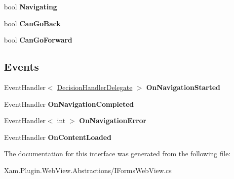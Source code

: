 \begin{DoxyCompactItemize}
bool {\bfseries Navigating}
\item 
\mbox{\label{interface_xam_1_1_plugin_1_1_web_view_1_1_abstractions_1_1_i_forms_web_view_a6189ad707789cb0eb2ff838b939c2c0d}} 
bool {\bfseries Can\+Go\+Back}
\item 
\mbox{\label{interface_xam_1_1_plugin_1_1_web_view_1_1_abstractions_1_1_i_forms_web_view_afb0f73e90962e66edd999a222a0ee62c}} 
bool {\bfseries Can\+Go\+Forward}
\end{DoxyCompactItemize}
\subsection*{Events}
\begin{DoxyCompactItemize}
\item 
\mbox{\label{interface_xam_1_1_plugin_1_1_web_view_1_1_abstractions_1_1_i_forms_web_view_aae722771350cc9dab5fd12e017a3635e}} 
Event\+Handler$<$ \hyperlink{class_xam_1_1_plugin_1_1_web_view_1_1_abstractions_1_1_delegates_1_1_decision_handler_delegate}{Decision\+Handler\+Delegate} $>$ {\bfseries On\+Navigation\+Started}
\item 
\mbox{\label{interface_xam_1_1_plugin_1_1_web_view_1_1_abstractions_1_1_i_forms_web_view_a718e2180e518f76b322b74b8d042a3ad}} 
Event\+Handler {\bfseries On\+Navigation\+Completed}
\item 
\mbox{\label{interface_xam_1_1_plugin_1_1_web_view_1_1_abstractions_1_1_i_forms_web_view_ae2ee500d8ac31ef5acce2ccfc114aa62}} 
Event\+Handler$<$ int $>$ {\bfseries On\+Navigation\+Error}
\item 
\mbox{\label{interface_xam_1_1_plugin_1_1_web_view_1_1_abstractions_1_1_i_forms_web_view_a7171fd59f3037aa4371ea96f38c09a42}} 
Event\+Handler {\bfseries On\+Content\+Loaded}
\end{DoxyCompactItemize}


The documentation for this interface was generated from the following file\+:\begin{DoxyCompactItemize}
\item 
Xam.\+Plugin.\+Web\+View.\+Abstractions/I\+Forms\+Web\+View.\+cs\end{DoxyCompactItemize}
